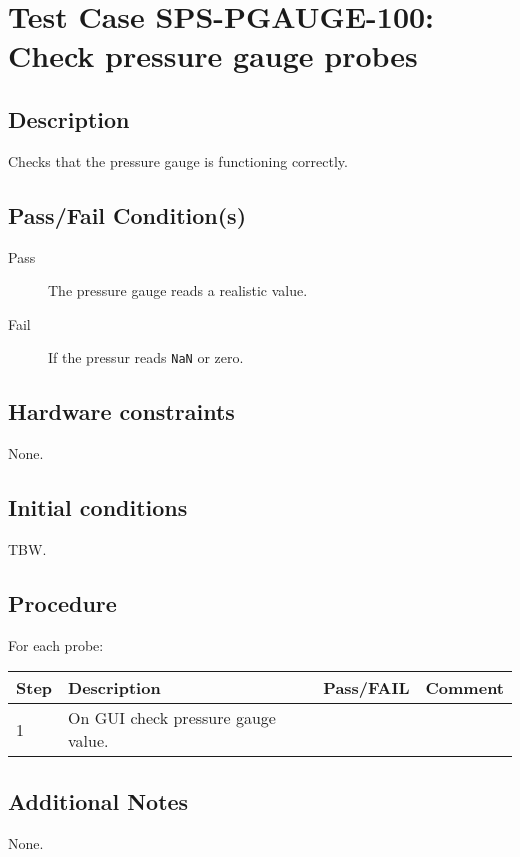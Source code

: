\section{Test Case SPS-PGAUGE-100: Check pressure gauge probes}

\subsection{Description}

Checks that the pressure gauge is functioning correctly.

\subsection{Pass/Fail Condition(s)}

\begin{description}
\item [Pass] The pressure gauge reads a realistic value.
\item [Fail] If the pressur reads \texttt{NaN} or zero.
\end{description}

\subsection{Hardware constraints}

None.

\subsection{Initial conditions}

TBW.

\subsection{Procedure}

For each probe:

\begin{table}[H]
    \begin{tabular}{|l| p{5cm} |l| p{5cm} |}
    \hline
    {\bf Step} & {\bf Description} & {\bf Pass/FAIL} & {\bf Comment}  \\ \hline
    1 & On GUI check pressure gauge value. &  &  \\ \hline
    \end{tabular}
\end{table}


\subsection{Additional Notes}

None.